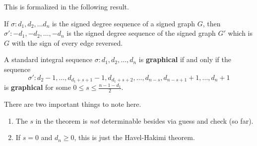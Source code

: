 \begin{frame}
    This is formalized in the following result.

    \begin{lemma}
        If $\sigma : d_1,d_2,\dots d_n$ is the signed degree sequence of a signed graph $G$, then $\sigma' : -d_1,-d_2,\dots,-d_n$ is the signed degree sequence of the signed graph $G'$ which is $G$ with the sign of every edge reversed.
    \end{lemma}
\end{frame}

\begin{frame}
    \begin{theorem}
        A standard integral sequence $\sigma : d_1,d_2,\dots,d_n$ is \textbf{graphical} if and only if the sequence
        \begin{equation*}
            \sigma' : d_2-1,\dots,d_{d_1+s+1}-1,d_{d_1+s+2},\dots,d_{n-s},d_{n-s+1}+1,\dots,d_n+1
        \end{equation*}
        is \textbf{graphical} for some $0 \leq s \leq \frac{n-1-d_1}{2}$.
    \end{theorem}
    There are two important things to note here.
    \begin{enumerate}
        \item The $s$ in the theorem is \textit{not} determinable besides via guess and check (so far).
        \item If $s = 0$ and $d_n \geq 0$, this is just the Havel-Hakimi theorem.
    \end{enumerate}
\end{frame}
